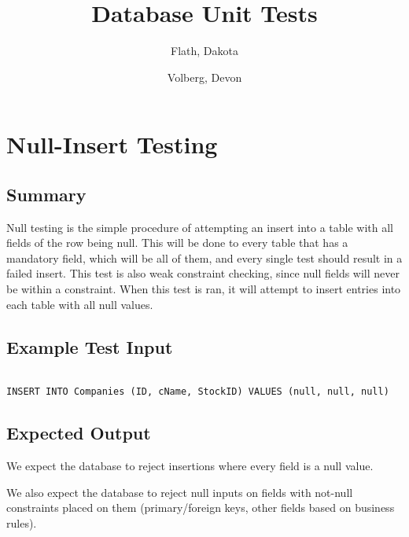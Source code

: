 \documentclass[12pt]{article}
\author{
	Flath, Dakota\\
	\and
	Volberg, Devon\\
}
\begin{document}
\renewcommand{\baselinestretch}{1.15} %
\setlength{\parindent}{0pt} %
\setlength{\parskip}{0.8em} %

\title{Database Unit Tests}
\maketitle

\newpage

\section{Null-Insert Testing}

\subsection{Summary}

Null testing is the simple procedure of attempting an insert into a table with all fields of the row being null. This will be done to every table that has a mandatory field, which will be all of them, and every single test should result in a failed insert. This test is also weak constraint checking, since null fields will never be within a constraint. When this test is ran, it will attempt to insert entries into each table with all null values.

\subsection{Example Test Input}

\begin{verbatim}

INSERT INTO Companies (ID, cName, StockID) VALUES (null, null, null)

\end{verbatim}

\subsection{Expected Output}

We expect the database to reject insertions where every field is a null value.

We also expect the database to reject null inputs on fields with not-null constraints placed on them (primary/foreign keys, other fields based on business rules). 
\end{document}
